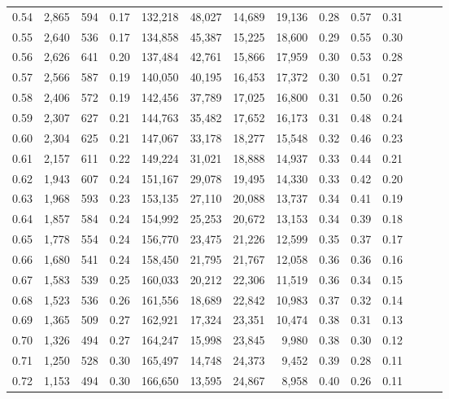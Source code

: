 \begin{tabular}{rrrrrrrrrrrrrr}
0.54 &  2,865 &  594 &  0.17 &  132,218 &   48,027 &  14,689 &  19,136 &  0.28 &  0.57 &      0.31 \\
0.55 &  2,640 &  536 &  0.17 &  134,858 &   45,387 &  15,225 &  18,600 &  0.29 &  0.55 &      0.30 \\
0.56 &  2,626 &  641 &  0.20 &  137,484 &   42,761 &  15,866 &  17,959 &  0.30 &  0.53 &      0.28 \\
0.57 &  2,566 &  587 &  0.19 &  140,050 &   40,195 &  16,453 &  17,372 &  0.30 &  0.51 &      0.27 \\
0.58 &  2,406 &  572 &  0.19 &  142,456 &   37,789 &  17,025 &  16,800 &  0.31 &  0.50 &      0.26 \\
0.59 &  2,307 &  627 &  0.21 &  144,763 &   35,482 &  17,652 &  16,173 &  0.31 &  0.48 &      0.24 \\
0.60 &  2,304 &  625 &  0.21 &  147,067 &   33,178 &  18,277 &  15,548 &  0.32 &  0.46 &      0.23 \\
0.61 &  2,157 &  611 &  0.22 &  149,224 &   31,021 &  18,888 &  14,937 &  0.33 &  0.44 &      0.21 \\
0.62 &  1,943 &  607 &  0.24 &  151,167 &   29,078 &  19,495 &  14,330 &  0.33 &  0.42 &      0.20 \\
0.63 &  1,968 &  593 &  0.23 &  153,135 &   27,110 &  20,088 &  13,737 &  0.34 &  0.41 &      0.19 \\
0.64 &  1,857 &  584 &  0.24 &  154,992 &   25,253 &  20,672 &  13,153 &  0.34 &  0.39 &      0.18 \\
0.65 &  1,778 &  554 &  0.24 &  156,770 &   23,475 &  21,226 &  12,599 &  0.35 &  0.37 &      0.17 \\
0.66 &  1,680 &  541 &  0.24 &  158,450 &   21,795 &  21,767 &  12,058 &  0.36 &  0.36 &      0.16 \\
0.67 &  1,583 &  539 &  0.25 &  160,033 &   20,212 &  22,306 &  11,519 &  0.36 &  0.34 &      0.15 \\
0.68 &  1,523 &  536 &  0.26 &  161,556 &   18,689 &  22,842 &  10,983 &  0.37 &  0.32 &      0.14 \\
0.69 &  1,365 &  509 &  0.27 &  162,921 &   17,324 &  23,351 &  10,474 &  0.38 &  0.31 &      0.13 \\
0.70 &  1,326 &  494 &  0.27 &  164,247 &   15,998 &  23,845 &   9,980 &  0.38 &  0.30 &      0.12 \\
0.71 &  1,250 &  528 &  0.30 &  165,497 &   14,748 &  24,373 &   9,452 &  0.39 &  0.28 &      0.11 \\
0.72 &  1,153 &  494 &  0.30 &  166,650 &   13,595 &  24,867 &   8,958 &  0.40 &  0.26 &      0.11 \\

\end{tabular}
